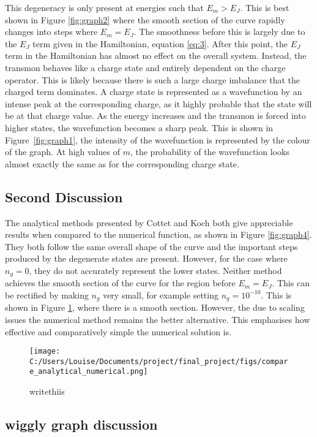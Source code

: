 \documentclass[11pt]{article}
\begin{document}
This degeneracy is only present at energies such that $E_m > E_J$. This is best shown in Figure \ref{fig:graph2} where the smooth section of the curve rapidly changes into steps where $E_m = E_J$. The smoothness before this is largely due to the $E_J$ term given in the Hamiltonian, equation \ref{eq:3}. After this point, the $E_J$ term in the Hamiltonian has almost no effect on the overall system. Instead, the transmon behaves like a charge state and entirely dependent on the charge operator. This is likely because there is such a large charge imbalance that the charged term dominates. A charge state is represented as a wavefunction by an intense peak at the corresponding charge, as it highly probable that the state will be at that charge value. As the energy increases and the transmon is forced into higher states, the wavefunction becomes a sharp peak. This is shown in Figure~\ref{fig:graph1}, the intensity of the wavefunction is represented by the colour of the graph. At high values of $m$, the probability of the wavefunction looks almost exactly the same as for the corresponding charge state.

\subsection{Second Discussion}
The analytical methods presented by Cottet and Koch both give appreciable results when compared to the numerical function, as shown in Figure \ref{fig:graph4}. They both follow the same overall shape of the curve and the important steps produced by the degenerate states are present. However, for the case where $n_g = 0$, they do not accurately represent the lower states. Neither method achieves the smooth section of the curve for the region before $E_m = E_J$. This can be rectified by making $n_g$ very small, for example setting $n_g = 10^{-10}$. This is shown in Figure \ref{fig:graph6}, where there is a smooth section. However, the due to scaling issues the numerical method remains the better alternative. This emphasises how effective and comparatively simple the numerical solution is.
\begin{figure}[ht]
\centering
\texttt{[image: C:/Users/Louise/Documents/project/final\_project/figs/compare\_analytical\_numerical.png]}
\caption{writethiis}
\label{fig:graph6}
\end{figure}

\subsection{wiggly graph discussion}
\end{document}
